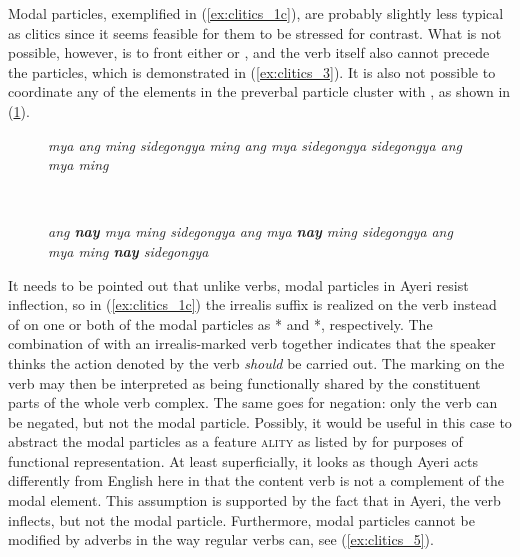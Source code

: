 \label{clitics_preverb_modal}
Modal particles, exemplified in (\ref{ex:clitics_1c}), are
probably slightly less typical as clitics since it seems feasible for them to
be stressed for contrast. What is not possible, however, is to front either
 or , and the verb itself
also cannot precede the particles, which is demonstrated in
(\ref{ex:clitics_3}). It is also not possible to coordinate any of the elements
in the preverbal particle cluster with , as shown in
(\ref{ex:clitics_4}).

\begin{figure}[h]
\begin{minipage}[t]{.5\linewidth}%
\pex\label{ex:clitics_3}%
\a \ljudge{*} \textit{mya ang ming sidegongya}
\a \ljudge{*} \textit{ming ang mya sidegongya}
\a \ljudge{*} \textit{sidegongya ang mya ming}
\xe
\end{minipage}
~
\begin{minipage}[t]{.5\linewidth}%
\pex\label{ex:clitics_4}%
\a \ljudge{*} \textit{ang \textbf{nay} mya ming sidegongya}
\a \ljudge{*} \textit{ang mya \textbf{nay} ming sidegongya}
\a \ljudge{*} \textit{ang mya ming \textbf{nay} sidegongya}
\xe
\end{minipage}
\end{figure}

It needs to be pointed out that unlike verbs, modal particles in Ayeri resist
inflection, so in (\ref{ex:clitics_1c}) the irrealis suffix 
is realized on the verb  instead
of on one or both of the modal particles as * and
*, respectively. The combination of  with an irrealis-marked verb together indicates that the speaker
thinks the action denoted by the verb \emph{should} be carried out. The marking
on the verb may then  be interpreted as being functionally shared by the
constituent parts of the whole verb complex. The same goes for negation: only
the verb can be negated, but not the modal particle. Possibly, it would be
useful in this case to abstract the modal particles as a feature
\Mod{}\textsc{ality} as listed by \citet[Feature Table]{pargram} for purposes
of functional representation. At least superficially, it looks as though Ayeri
acts differently from English here in that the content verb is not a complement
of the modal element. This assumption is supported by the fact that in Ayeri,
the verb inflects, but not the modal particle. Furthermore, modal particles
cannot be modified by adverbs in the way regular verbs can, see
(\ref{ex:clitics_5}).

